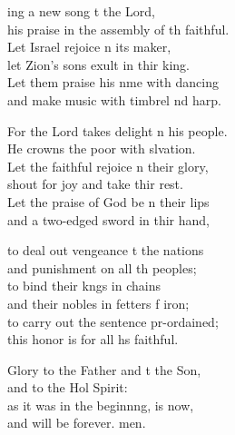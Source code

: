 \begin{psalmverse}
  \begin{patverse}
    ing a new song t the Lord,\Med\\
his praise in the assembly of th faithful.\\
Let Israel rejoice \pointup{\i}n its maker,\Med\\
let Zion’s sons exult in thir king.\\
Let them praise his nme with dancing\Med\\
and make music with timbrel nd harp.

For the Lord takes delight \pointup{\i}n his people.\Med\\
He crowns the poor with slvation.\\
Let the faithful rejoice \pointup{\i}n their glory,\Med\\
shout for joy and take thir rest.\\
Let the praise of God be n their lips\Med\\
and a two-edged sword in thir hand,

to deal out vengeance t the nations\Med\\
and punishment on all th peoples;\\
to bind their k\pointup{\i}ngs in chains\Med\\
and their nobles in fetters f iron;\\
to carry out the sentence pr-ordained;\Med\\
this honor is for all h\pointup{\i}s faithful.

Glory to the Father and t the Son,\Med\\
and to the Hol Spirit:\\
as it was in the beginn\pointup{\i}ng, is now,\Med\\
and will be forever. men.
  \end{patverse}
\end{psalmverse}
